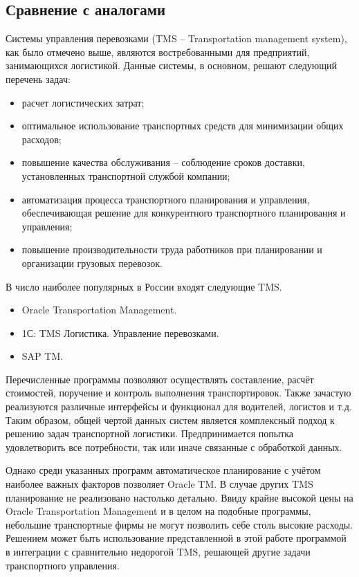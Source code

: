 \subsection{Сравнение с аналогами}
	Системы управления перевозками (TMS -- Transportation management system), как было отмечено выше, являются востребованными для предприятий, занимающихся логистикой. Данные системы, в основном, решают следующий перечень задач\cite{subj:tms_cmp}:
	\begin{itemize}
		\item расчет логистических затрат;
		\item оптимальное использование транспортных средств для минимизации
		общих расходов;
		\item повышение качества обслуживания -- соблюдение сроков доставки, установленных транспортной службой компании;
		\item автоматизация процесса транспортного планирования и управления,
		обеспечивающая решение для конкурентного транспортного планирования
		и управления;
		\item повышение производительности труда работников при планировании и
		организации грузовых перевозок.
	\end{itemize}

	\hfill
	
	В число наиболее популярных в России входят следующие TMS.
	\begin{itemize}
		\item Oracle Transportation Management.
		\item 1С: TMS Логистика. Управление перевозками.
		\item SAP TM.
	\end{itemize}

	Перечисленные программы позволяют осуществлять составление, расчёт стоимостей, поручение и контроль выполнения транспортировок. Также зачастую реализуются различные интерфейсы и функционал для водителей, логистов и т.д. Таким образом, общей чертой данных систем является комплексный подход к решению задач транспортной логистики. Предпринимается попытка удовлетворить все потребности, так или иначе связанные с обработкой данных.   
	
	Однако среди указанных программ автоматическое планирование с учётом наиболее важных факторов позволяет Oracle TM. В случае других TMS планирование не реализовано настолько детально. Ввиду крайне высокой цены\cite{subj:tms_cmp} на Oracle Transportation Management и в целом на подобные программы, небольшие транспортные фирмы не могут позволить себе столь высокие расходы. Решением может быть использование представленной в этой работе программой в интеграции с сравнительно недорогой TMS, решающей другие задачи транспортного управления.
	

